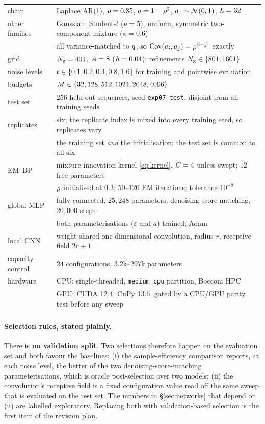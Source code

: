 \begin{center}
\small
\begin{tabular}{ll}
\toprule
chain & Laplace AR(1), $\rho=0.85$, $q=1-\rho^2$, $a_1\sim\mathcal{N}\!\left(0,1\right)$, $L=32$ \\
other families & Gaussian, Student-$t$ ($\nu=5$), uniform, symmetric two-component mixture
                 ($\kappa=0.6$) \\
                & all variance-matched to $q$, so $\operatorname{Cov}(a_i,a_j)=\rho^{|i-j|}$ exactly \\
grid & $N_{\mathrm{g}}=401$, $A=8$ ($h=0.04$); refinements $N_{\mathrm{g}}\in\{801,1601\}$ \\
noise levels & $t\in\{0.1,0.2,0.4,0.8,1.6\}$ for training and pointwise evaluation \\
budgets & $M\in\{32,128,512,1024,2048,4096\}$ \\
test set & $256$ held-out sequences, seed \texttt{exp07-test}, disjoint from all training seeds \\
replicates & six; the replicate index is mixed into every training seed, so replicates vary \\
           & the training set \emph{and} the initialisation; the test set is common to all six \\
\midrule
EM--BP & mixture-innovation kernel \eqref{eq:kernel}, $C=4$ unless swept;
         $12$ free parameters \\
       & $\rho$ initialised at $0.3$; $50$--$120$ EM iterations; tolerance $10^{-9}$ \\
global MLP & fully connected, $25{,}248$ parameters, denoising score matching, $20{,}000$
             steps \\
           & both parameterisations ($\varepsilon$ and $a$) trained; Adam \\
local CNN & weight-shared one-dimensional convolution, radius $r$, receptive field $2r+1$ \\
capacity control & $24$ configurations, $3.2$k--$297$k parameters \\
\midrule
hardware & CPU: single-threaded, \texttt{medium\_cpu} partition, Bocconi HPC \\
         & GPU: CUDA 12.4, CuPy 13.6, gated by a CPU/GPU parity test before any sweep \\
\bottomrule
\end{tabular}
\end{center}

\paragraph{Selection rules, stated plainly.} There is \textbf{no validation split}. Two selections
therefore happen on the evaluation set and both favour the baselines: (i) the sample-efficiency comparison
reports, at each noise level, the better of the two denoising-score-matching parameterisations,
which is oracle post-selection over two models; (ii) the convolution's receptive field is a fixed
configuration value read off the same sweep that is evaluated on the test set. The numbers in
\S\ref{sec:networks} that depend on (ii) are labelled exploratory. Replacing both with
validation-based selection is the first item of the revision plan.

